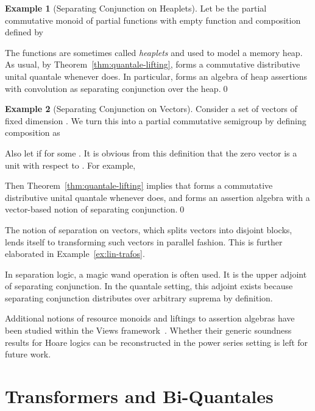 \documentclass[12pt]{article}
\theoremstyle{definition}
\newtheorem{example}{Example}
\begin{document}
\begin{example}[Separating Conjunction on Heaplets]\label{ex:separating-conjunction-heaplets}
  Let  be the partial commutative monoid of partial
  functions  with empty function  and
  composition defined by
    
    The functions  are sometimes called \emph{heaplets} and used
    to model a memory heap. As usual, by
    Theorem~\ref{thm:quantale-lifting},  forms a commutative
    distributive unital quantale whenever  does. In particular,
     forms an algebra of heap assertions with
    convolution as separating conjunction over the heap.\qed
\end{example}

\begin{example}[Separating Conjunction on Vectors]\label{ex:separating-conjunction-vectors}
  Consider a set  of vectors  of fixed dimension . We
  turn this into a partial commutative semigroup by defining composition as
  
  Also let  if  for some . It is
  obvious from this definition that the zero vector  is a unit with
  respect to . For example,
  
  Then Theorem~\ref{thm:quantale-lifting} implies that  forms a
  commutative distributive unital quantale whenever  does, and
   forms an assertion algebra with a vector-based notion
  of separating conjunction.\qed
\end{example}
The notion of separation on vectors, which splits vectors into
disjoint blocks, lends itself to transforming such vectors in parallel
fashion. This is further elaborated in Example~\ref{ex:lin-trafos}.

In separation logic, a magic wand operation is often used. It is the
upper adjoint of separating conjunction. In the quantale setting, this
adjoint exists because separating conjunction distributes over
arbitrary suprema by definition.

Additional notions of resource monoids and liftings to assertion
algebras have been studied within the Views
framework~\cite{D-YBGPY13}. Whether their generic soundness results for
Hoare logics can be reconstructed in the power series setting is left
for future work.



\section{Transformers and Bi-Quantales}\label{sec:transformers}
\end{document}
